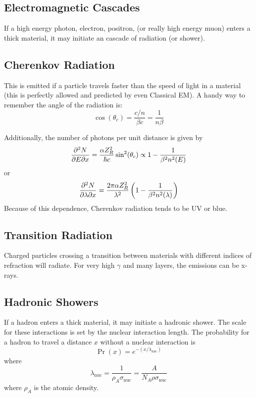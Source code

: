 \documentclass[a4paper,twoside,master.tex]{subfiles}
\begin{document}

\subsection{Electromagnetic Cascades}
If a high energy photon, electron, positron, (or really high energy muon) enters a thick material, it may initiate an cascade of radiation (or shower).

\subsection{Cherenkov Radiation}
This is emitted if a particle travels faster than the speed of light in a material (this is perfectly allowed and predicted by even Classical EM). A handy way to remember the angle of the radiation is:
\begin{equation}
    \cos(\theta_c) = \frac{c/n}{\beta c} = \frac{1}{n \beta}
\end{equation}

Additionally, the number of photons per unit distance is given by
\begin{equation}
    \pdv{N}{E}{x} = \frac{\alpha Z_R^2}{\hbar c} \sin[2](\theta_c) \propto 1 - \frac{1}{\beta^2 n^2(E)}
\end{equation}
or
\begin{equation}
    \pdv{N}{\lambda}{x} = \frac{2 \pi \alpha Z^2_R}{\lambda^2} \left( 1 - \frac{1}{\beta^2 n^2(\lambda)} \right)
\end{equation}
Because of this dependence, Cherenkov radiation tends to be UV or blue.

\subsection{Transition Radiation}
\label{sub:transition_radiation}

Charged particles crossing a transition between materials with different indices of refraction will radiate. For very high $ \gamma $ and many layers, the emissions can be x-rays.

\subsection{Hadronic Showers}
\label{sub:hadronic_showers}

If a hadron enters a thick material, it may initiate a hadronic shower. The scale for these interactions is set by the nuclear interaction length. The probability for a hadron to travel a distance $ x $ without a nuclear interaction is
\begin{equation}
    \Pr(x) = e^{-(x/ \lambda_{\text{nuc}} )}
\end{equation}
where
\begin{equation}
    \lambda_{\text{nuc}} = \frac{1}{\rho_A \sigma_{\text{nuc}}} = \frac{A}{N_A \rho \sigma_{\text{nuc}}}
\end{equation}
where $ \rho_A $ is the atomic density.
\end{document}

